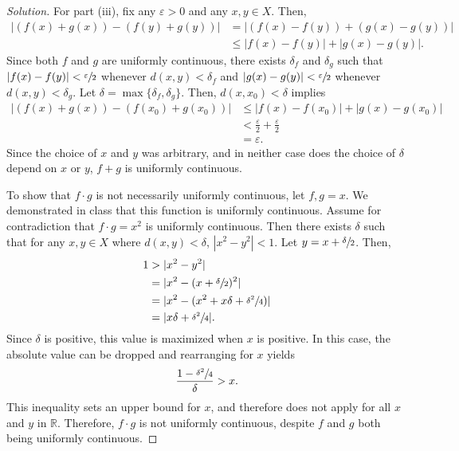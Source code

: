 \documentclass[11pt,letterpaper]{article}
\newcommand{\R}{\mathbb{R}}
\newcommand{\eps}{\varepsilon}
\renewcommand{\epsilon}{\eps}
\newenvironment{solution}
  {\renewcommand\qedsymbol{}\begin{proof}[Solution]}
  {\end{proof}\bigskip}
\begin{document}
\begin{solution}
	For part (iii), fix any $\epsilon > 0$ and any $x,y \in X$. Then, 
	\[\begin{split}
		|(f(x) + g(x)) - (f(y) + g(y))| &=  | (f(x) - f(y)) + (g(x) - g(y))|\\
		& \leq | f(x) - f(y) |+|g(x) - g(y)|.
	\end{split}\]
	Since both $f$ and $g$ are uniformly continuous, there exists $\delta_f$ and $\delta_g$ such that $|f(x) - f(y)| < \sfrac{\epsilon}{2}$ whenever $d(x,y) < \delta_f$ and $|g(x) - g(y)| < \sfrac{\epsilon}{2}$ whenever $d(x,y) < \delta_g$. Let $\delta = \max\{\delta_f, \delta_g\}$. Then, $d(x,x_0) < \delta$ implies 
	\[\begin{split}
		|(f(x) + g(x)) - (f(x_0) + g(x_0))| & \leq | f(x) - f(x_0) |+|g(x) - g(x_0)|\\
		&<\frac{\epsilon}{2} + \frac{\epsilon}{2}\\
		&= \epsilon.
	\end{split}\]
	Since the choice of $x$ and $y$ was arbitrary, and in neither case does the choice of $\delta$ depend on $x$ or $y$, $f+g$ is uniformly continuous.
	
	To show that $f\cdot g$ is not necessarily uniformly continuous, let $f,g = x$. We demonstrated in class that this function is uniformly continuous. Assume for contradiction that $f\cdot g = x^2$ is uniformly continuous. Then there exists $\delta$ such that for any $x,y \in X$ where $d(x,y) < \delta$, $|x^2-y^2| < 1$. Let $y = x + \sfrac{\delta}{2}$. Then,
	\[\begin{split}
		1&> |x^2-y^2| \\
		&=|x^2-(x + \sfrac{\delta}{2})^2|\\
		&= |x^2-(x^2 + x\delta + \sfrac{\delta^2}{4})|\\
		&=|x\delta +\sfrac{\delta^2}{4}|.
	\end{split}\]
	Since $\delta$ is positive, this value is maximized when $x$ is positive. In this case, the absolute value can be dropped and rearranging for $x$ yields $$\frac{1-\sfrac{\delta^2}{4}}{\delta} > x.$$ This inequality sets an upper bound for $x$, and therefore does not apply for all $x$ and $y$ in $\R$. Therefore, $f\cdot g$ is not uniformly continuous, despite $f$ and $g$ both being uniformly continuous.
	
\end{solution}
\end{document}
